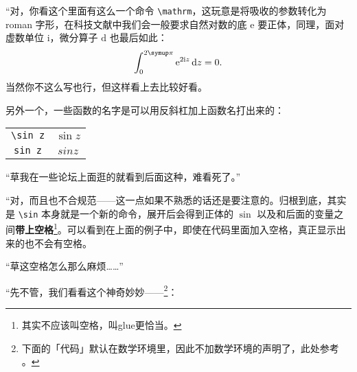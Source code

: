 “对，你看这个里面有这么一个命令 \verb"\mathrm"，这玩意是将吸收的参数转化为 roman 字形，在科技文献中我们会一般要求自然对数的底 $\mathrm{e}$ 要正体，同理，面对虚数单位 $\mathrm{i}$，微分算子 $\mathrm{d}$ 也最后如此：
\[
    \int_0^{2\symup\pi } \mathrm{e} ^ {2 \mathrm{i} z } \,\mathrm{d}z = 0
    .\]
当然你不这么写也行，但这样看上去比较好看。

另外一个，一些函数的名字是可以用反斜杠加上函数名打出来的：

\begin{center}
    \begin{tabular}{cc}
        \verb"\sin z" & $\sin z$ \\
        \verb"sin z"  & $sin z$  \\
    \end{tabular}
\end{center}

“草我在一些论坛上面逛的就看到后面这种，难看死了。”

“对，而且也不合规范——这一点如果不熟悉的话还是要注意的。归根到底，其实是 \verb"\sin" 本身就是一个新的命令，展开后会得到正体的 $\sin $ 以及和后面的变量之间\textbf{带上空格}\footnote{其实不应该叫空格，叫glue更恰当。}。可以看到在上面的例子中，即使在代码里面加入空格，真正显示出来的也不会有空格。

“草这空格怎么那么麻烦……”

“先不管，我们看看这个神奇妙妙——\footnote{下面的「代码」默认在数学环境里，因此不加数学环境的声明了，此处参考 \textcite[Symbols defined by unicode-math]{WillRobertson} 。}：

